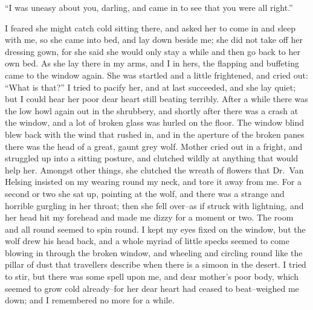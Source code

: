 \documentclass[12pt,openright]{book}
\begin{document}
“I was uneasy about you, darling, and came in to see that you were all right.”

I feared she might catch cold sitting there, and asked her to come in and sleep with me, so she came into bed, and lay down beside me; she did not take off her dressing gown, for she said she would only stay a while and then go back to her own bed. As she lay there in my arms, and I in hers, the flapping and buffeting came to the window again. She was startled and a little frightened, and cried out: “What is that?” I tried to pacify her, and at last succeeded, and she lay quiet; but I could hear her poor dear heart still beating terribly. After a while there was the low howl again out in the shrubbery, and shortly after there was a crash at the window, and a lot of broken glass was hurled on the floor. The window blind blew back with the wind that rushed in, and in the aperture of the broken panes there was the head of a great, gaunt grey wolf. Mother cried out in a fright, and struggled up into a sitting posture, and clutched wildly at anything that would help her. Amongst other things, she clutched the wreath of flowers that Dr. Van Helsing insisted on my wearing round my neck, and tore it away from me. For a second or two she sat up, pointing at the wolf, and there was a strange and horrible gurgling in her throat; then she fell over–as if struck with lightning, and her head hit my forehead and made me dizzy for a moment or two. The room and all round seemed to spin round. I kept my eyes fixed on the window, but the wolf drew his head back, and a whole myriad of little specks seemed to come blowing in through the broken window, and wheeling and circling round like the pillar of dust that travellers describe when there is a simoon in the desert. I tried to stir, but there was some spell upon me, and dear mother’s poor body, which seemed to grow cold already–for her dear heart had ceased to beat–weighed me down; and I remembered no more for a while.
\end{document}

